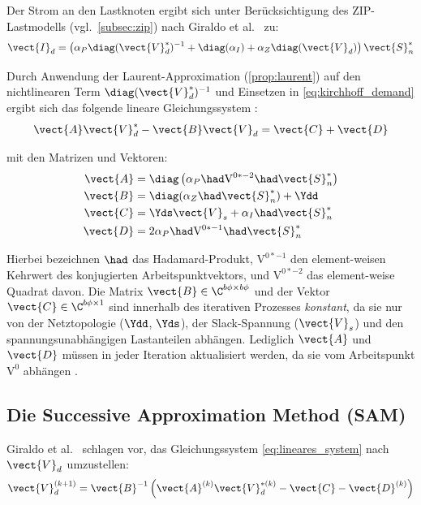 Der Strom an den Lastknoten ergibt sich unter Berücksichtigung des ZIP-Lastmodells (vgl.\ \cref{subsec:zip}) nach Giraldo et al.\ \cite{Giraldo2022} zu:
\begin{equation}
	\vect{I}_d = \left(\alpha_P \diag(\vect{V}_d^*)^{-1} + \diag(\alpha_I) + \alpha_Z \diag(\vect{V}_d)\right) \vect{S}_n^*
	\label{eq:strom_zip}
\end{equation}

Durch Anwendung der Laurent-Approximation (\cref{prop:laurent}) auf den nichtlinearen Term $\diag(\vect{V}_d^*)^{-1}$ und Einsetzen in \eqref{eq:kirchhoff_demand} ergibt sich das folgende lineare Gleichungssystem \cite{Giraldo2022}:
\begin{equation}
	\vect{A}\vect{V}_d^* - \vect{B}\vect{V}_d = \vect{C} + \vect{D}
	\label{eq:lineares_system}
\end{equation}

mit den Matrizen und Vektoren:
\begin{align}
	\vect{A} &= \diag\left(\alpha_P \had \mathrm{V}^{0*-2} \had \vect{S}_n^*\right) \label{eq:giraldo_A}\\
	\vect{B} &= \diag(\alpha_Z \had \vect{S}_n^*) + \Ydd \label{eq:giraldo_B}\\
	\vect{C} &= \Yds \vect{V}_s + \alpha_I \had \vect{S}_n^* \label{eq:giraldo_C}\\
	\vect{D} &= 2\alpha_P \had \mathrm{V}^{0*-1} \had \vect{S}_n^* \label{eq:giraldo_D}
\end{align}

Hierbei bezeichnen $\had$ das Hadamard-Produkt, $\mathrm{V}^{0*-1}$ den element-weisen Kehrwert des konjugierten Arbeitspunktvektors, und $\mathrm{V}^{0*-2}$ das element-weise Quadrat davon. Die Matrix $\vect{B} \in \C^{b\phi \times b\phi}$ und der Vektor $\vect{C} \in \C^{b\phi \times 1}$ sind innerhalb des iterativen Prozesses \textit{konstant}, da sie nur von der Netztopologie ($\Ydd$, $\Yds$), der Slack-Spannung ($\vect{V}_s$) und den spannungsunabhängigen Lastanteilen abhängen. Lediglich $\vect{A}$ und $\vect{D}$ müssen in jeder Iteration aktualisiert werden, da sie vom Arbeitspunkt $\mathrm{V}^0$ abhängen \cite{Giraldo2022}.

\subsection{Die Successive Approximation Method (SAM)}
\label{subsec:sam}

Giraldo et al.\ \cite{Giraldo2022} schlagen vor, das Gleichungssystem \eqref{eq:lineares_system} nach $\vect{V}_d$ umzustellen:
\begin{equation}
	\vect{V}_d^{(k+1)} = \vect{B}^{-1}\left(\vect{A}^{(k)} \vect{V}_d^{*(k)} - \vect{C} - \vect{D}^{(k)}\right)
	\label{eq:sam_iteration}
\end{equation}

